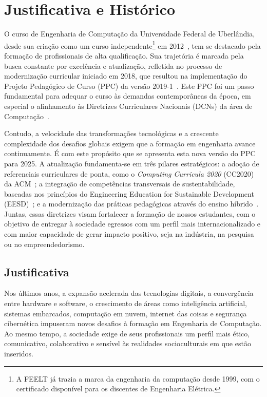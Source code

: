 \chapter{Justificativa e Histórico}

O curso de Engenharia de Computação da Universidade Federal de Uberlândia, desde sua criação como um curso independente\footnote{A FEELT já trazia a marca da engenharia da computação desde 1999, com o certificado disponível para os discentes de Engenharia Elétrica.} em 2012~\cite{UFU:CONSUN:20:2012}, tem se destacado pela formação de profissionais de alta qualificação. Sua trajetória é marcada pela busca constante por excelência e atualização, refletida no processo de modernização curricular iniciado em 2018, que resultou na implementação do Projeto Pedagógico de Curso (PPC) da versão 2019-1~\cite{UFU:FEELT:PPC:EC:2019}. Este PPC foi um passo fundamental para adequar o curso às demandas contemporâneas da época, em especial o alinhamento às Diretrizes Curriculares Nacionais (DCNs) da área de Computação~\cite{MEC:CNE:CES:5:2016}.

Contudo, a velocidade das transformações tecnológicas e a crescente complexidade dos desafios globais exigem que a formação em engenharia avance continuamente. É com este propósito que se apresenta esta nova versão do PPC para 2025. A atualização fundamenta-se em três pilares estratégicos: a adoção de referenciais curriculares de ponta, como o \textit{Computing Curricula 2020} (CC2020) da ACM~\cite{ACM:CC2020}; a integração de competências transversais de sustentabilidade, baseadas nos princípios do Engineering Education for Sustainable Development (EESD)~\cite{UNESCO:Eng4SusDev:2021}; e a modernização das práticas pedagógicas através do ensino híbrido~\cite{Decreto:12456:2025}. Juntas, essas diretrizes visam fortalecer a formação de nossos estudantes, com o objetivo de entregar à sociedade egressos com um perfil mais internacionalizado e com maior capacidade de gerar impacto positivo, seja na indústria, na pesquisa ou no empreendedorismo.

\section{Justificativa}

Nos últimos anos, a expansão acelerada das tecnologias digitais, a convergência entre hardware e software, o crescimento de áreas como inteligência artificial, sistemas embarcados, computação em nuvem, internet das coisas e segurança cibernética impuseram novos desafios à formação em Engenharia de Computação. Ao mesmo tempo, a sociedade exige de seus profissionais um perfil mais ético, comunicativo, colaborativo e sensível às realidades socioculturais em que estão inseridos.

